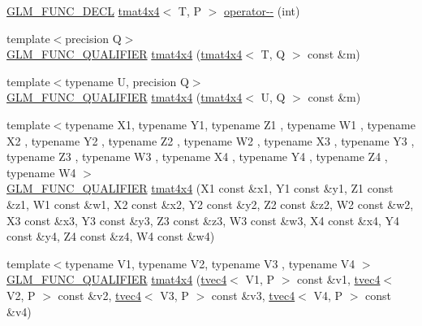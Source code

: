 \begin{DoxyCompactItemize}
\item 
\hyperlink{setup_8hpp_ab2d052de21a70539923e9bcbf6e83a51}{G\+L\+M\+\_\+\+F\+U\+N\+C\+\_\+\+D\+E\+CL} \hyperlink{structglm_1_1detail_1_1tmat4x4}{tmat4x4}$<$ T, P $>$ \hyperlink{structglm_1_1detail_1_1tmat4x4_a38f9e3d1a2d4b37646311ce7a798aacd}{operator-\/-\/} (int)
\item 
{\footnotesize template$<$precision Q$>$ }\\\hyperlink{setup_8hpp_a33fdea6f91c5f834105f7415e2a64407}{G\+L\+M\+\_\+\+F\+U\+N\+C\+\_\+\+Q\+U\+A\+L\+I\+F\+I\+ER} \hyperlink{structglm_1_1detail_1_1tmat4x4_aee39aabdc85b598efc2fa0f515bd7228}{tmat4x4} (\hyperlink{structglm_1_1detail_1_1tmat4x4}{tmat4x4}$<$ T, Q $>$ const \&m)
\item 
{\footnotesize template$<$typename U, precision Q$>$ }\\\hyperlink{setup_8hpp_a33fdea6f91c5f834105f7415e2a64407}{G\+L\+M\+\_\+\+F\+U\+N\+C\+\_\+\+Q\+U\+A\+L\+I\+F\+I\+ER} \hyperlink{structglm_1_1detail_1_1tmat4x4_acd4383cfa5e9463cb5d2e791b34a2a46}{tmat4x4} (\hyperlink{structglm_1_1detail_1_1tmat4x4}{tmat4x4}$<$ U, Q $>$ const \&m)
\item 
{\footnotesize template$<$typename X1, typename Y1, typename Z1 , typename W1 , typename X2 , typename Y2 , typename Z2 , typename W2 , typename X3 , typename Y3 , typename Z3 , typename W3 , typename X4 , typename Y4 , typename Z4 , typename W4 $>$ }\\\hyperlink{setup_8hpp_a33fdea6f91c5f834105f7415e2a64407}{G\+L\+M\+\_\+\+F\+U\+N\+C\+\_\+\+Q\+U\+A\+L\+I\+F\+I\+ER} \hyperlink{structglm_1_1detail_1_1tmat4x4_a4ff165b66bf5ce7b3a56f17727741389}{tmat4x4} (X1 const \&x1, Y1 const \&y1, Z1 const \&z1, W1 const \&w1, X2 const \&x2, Y2 const \&y2, Z2 const \&z2, W2 const \&w2, X3 const \&x3, Y3 const \&y3, Z3 const \&z3, W3 const \&w3, X4 const \&x4, Y4 const \&y4, Z4 const \&z4, W4 const \&w4)
\item 
{\footnotesize template$<$typename V1, typename V2, typename V3 , typename V4 $>$ }\\\hyperlink{setup_8hpp_a33fdea6f91c5f834105f7415e2a64407}{G\+L\+M\+\_\+\+F\+U\+N\+C\+\_\+\+Q\+U\+A\+L\+I\+F\+I\+ER} \hyperlink{structglm_1_1detail_1_1tmat4x4_ad7a7e2dc47a7bd42e43ddf68efbab34f}{tmat4x4} (\hyperlink{structglm_1_1detail_1_1tvec4}{tvec4}$<$ V1, P $>$ const \&v1, \hyperlink{structglm_1_1detail_1_1tvec4}{tvec4}$<$ V2, P $>$ const \&v2, \hyperlink{structglm_1_1detail_1_1tvec4}{tvec4}$<$ V3, P $>$ const \&v3, \hyperlink{structglm_1_1detail_1_1tvec4}{tvec4}$<$ V4, P $>$ const \&v4)
\item 

\end{DoxyCompactItemize}
